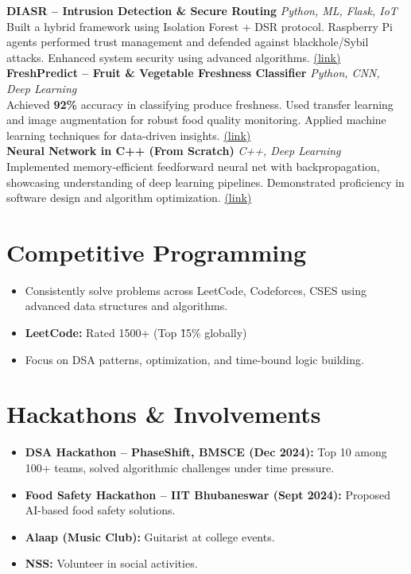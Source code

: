 \documentclass[letterpaper,10.5pt]{article}
\newcommand{\resumeItem}[1]{\item\small{#1}}
\newcommand{\resumeItemListStart}{\begin{itemize}[noitemsep,topsep=0pt,parsep=0pt,partopsep=0pt]}
\newcommand{\resumeItemListEnd}{\end{itemize}}
\begin{document}
\noindent
\textbf{DIASR – Intrusion Detection \& Secure Routing} \textit{Python, ML, Flask, IoT} \\
Built a hybrid framework using Isolation Forest + DSR protocol. Raspberry Pi agents performed trust management and defended against blackhole/Sybil attacks. Enhanced system security using advanced algorithms. \href{https://github.com/Protham1/DIDS/tree/v1}{(link)} \\[6pt]

\noindent
\textbf{FreshPredict – Fruit \& Vegetable Freshness Classifier} \textit{Python, CNN, Deep Learning} \\
Achieved \textbf{92\%} accuracy in classifying produce freshness. Used transfer learning and image augmentation for robust food quality monitoring. Applied machine learning techniques for data-driven insights. \href{https://github.com/Protham1/FreshPredict}{(link)} \\[6pt]

\noindent
\textbf{Neural Network in C++ (From Scratch)} \textit{C++, Deep Learning} \\
Implemented memory-efficient feedforward neural net with backpropagation, showcasing understanding of deep learning pipelines. Demonstrated proficiency in software design and algorithm optimization. \href{https://github.com/Protham1/DL}{(link)} \\[6pt]

\section*{Competitive Programming}
\resumeItemListStart
    \resumeItem{Consistently solve problems across LeetCode, Codeforces, CSES using advanced data structures and algorithms.}
    \resumeItem{\textbf{LeetCode:} Rated 1500+ (Top \~15\% globally)}
    \resumeItem{Focus on DSA patterns, optimization, and time-bound logic building.}
\resumeItemListEnd

\section*{Hackathons \& Involvements}
\resumeItemListStart
  \resumeItem{\textbf{DSA Hackathon – PhaseShift, BMSCE (Dec 2024):} Top 10 among 100+ teams, solved algorithmic challenges under time pressure.}
  \resumeItem{\textbf{Food Safety Hackathon – IIT Bhubaneswar (Sept 2024):} Proposed AI-based food safety solutions.}
  \resumeItem{\textbf{Alaap (Music Club):} Guitarist at college events.}
  \resumeItem{\textbf{NSS:} Volunteer in social activities.}
\resumeItemListEnd
\end{document}
